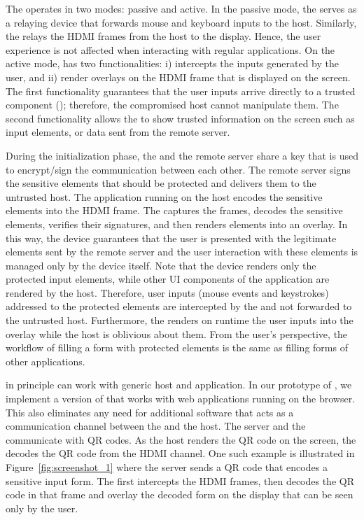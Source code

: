  The \device operates in two modes: passive and active. In the passive mode, the \device serves as a relaying device that forwards mouse and keyboard inputs to the host. Similarly, the \device relays the HDMI frames from the host to the display. Hence, the user experience is not affected when interacting with regular applications. On the active mode, \device has two functionalities: i) intercepts the inputs generated by the user, and ii) render overlays on the HDMI frame that is displayed on the screen. 
The first functionality guarantees that the user inputs arrive directly to a trusted component (\device); therefore, the compromised host cannot manipulate them. The second functionality allows the \device to show trusted information on the screen such as input elements, or data sent from the remote server.

During the initialization phase, the \device and the remote server share a key that is used to encrypt/sign the communication between each other. The remote server signs the sensitive elements that should be protected and delivers them to the untrusted host. The application running on the host encodes the sensitive elements into the HDMI frame. The \device captures the frames, decodes the sensitive elements, verifies their signatures, and then renders elements into an overlay. In this way, the device guarantees that the user is presented with the legitimate elements sent by the remote server and the user interaction with these elements is managed only by the device itself. Note that the device renders only the protected input elements, while other UI components of the application are rendered by the host. 
Therefore, user inputs (mouse events and keystrokes) addressed to the protected elements are intercepted by the \device and not forwarded to the untrusted host. Furthermore, the \device renders on runtime the user inputs into the overlay while the host is oblivious about them. From the user's perspective, the workflow of filling a form with protected elements is the same as filling forms of other applications.

 \name in principle can work with generic host and application. In our prototype of \name, we implement a version of \name that works with web applications running on the browser. This also eliminates any need for additional software that acts as a communication channel between the \device and the host. The server and the \device communicate with QR codes. As the host renders the QR code on the screen, the \device decodes the QR code from the HDMI channel. One such example is illustrated in Figure~\ref{fig:screenshot_1} where the server sends a QR code that encodes a sensitive input form. The \device first intercepts the HDMI frames, then decodes the QR code in that frame and overlay the decoded form on the display that can be seen only by the user. 

